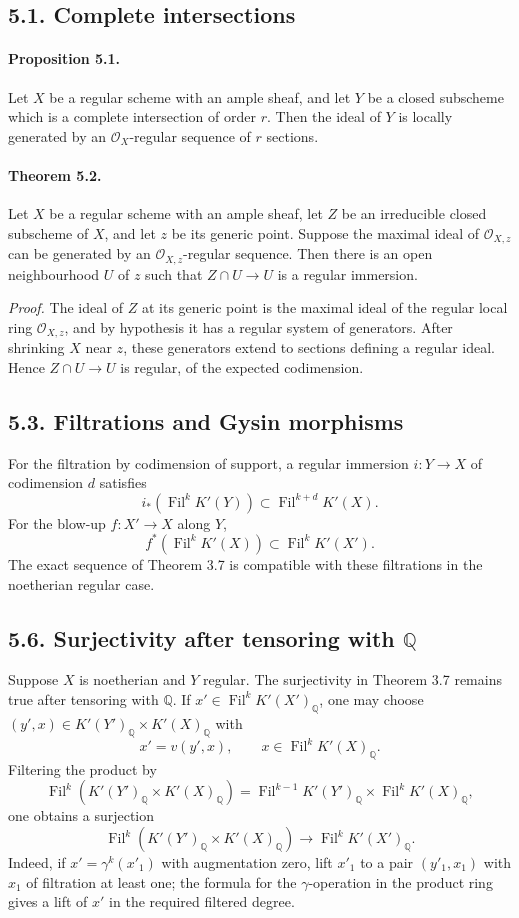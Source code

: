 \documentclass[12pt]{article}
\newcommand{\QQ}{\mathbb Q}
\newcommand{\cO}{\mathcal O}
\newcommand{\Fil}{\operatorname{Fil}}
\begin{document}
\subsection*{5.1. Complete intersections}

\paragraph{Proposition 5.1.} Let $X$ be a regular scheme with an ample sheaf, and let $Y$ be a closed subscheme which is a complete intersection of order $r$. Then the ideal of $Y$ is locally generated by an $\cO_X$-regular sequence of $r$ sections.

\paragraph{Theorem 5.2.} Let $X$ be a regular scheme with an ample sheaf, let $Z$ be an irreducible closed subscheme of $X$, and let $z$ be its generic point. Suppose the maximal ideal of $\cO_{X,z}$ can be generated by an $\cO_{X,z}$-regular sequence. Then there is an open neighbourhood $U$ of $z$ such that $Z\cap U\to U$ is a regular immersion.

\emph{Proof.} The ideal of $Z$ at its generic point is the maximal ideal of the regular local ring $\cO_{X,z}$, and by hypothesis it has a regular system of generators. After shrinking $X$ near $z$, these generators extend to sections defining a regular ideal. Hence $Z\cap U\to U$ is regular, of the expected codimension.

\subsection*{5.3. Filtrations and Gysin morphisms}

For the filtration by codimension of support, a regular immersion $i:Y\to X$ of codimension $d$ satisfies
\[
i_*(\Fil^kK'(Y))\subset\Fil^{k+d}K'(X).
\]
For the blow-up $f:X'\to X$ along $Y$,
\[
f^*(\Fil^kK'(X))\subset\Fil^kK'(X').
\]
The exact sequence of Theorem 3.7 is compatible with these filtrations in the noetherian regular case.

\subsection*{5.6. Surjectivity after tensoring with $\QQ$}

Suppose $X$ is noetherian and $Y$ regular. The surjectivity in Theorem 3.7 remains true after tensoring with $\QQ$. If $x'\in\Fil^kK'(X')_\QQ$, one may choose $(y',x)\in K'(Y')_\QQ\times K'(X)_\QQ$ with
\[
x'=v(y',x),\qquad x\in\Fil^kK'(X)_\QQ.
\]
Filtering the product by
\[
\Fil^k(K'(Y')_\QQ\times K'(X)_\QQ)=\Fil^{k-1}K'(Y')_\QQ\times\Fil^kK'(X)_\QQ,
\]
one obtains a surjection
\[
\Fil^k(K'(Y')_\QQ\times K'(X)_\QQ)\longrightarrow\Fil^kK'(X')_\QQ.
\]
Indeed, if $x'=\gamma^k(x'_1)$ with augmentation zero, lift $x'_1$ to a pair $(y'_1,x_1)$ with $x_1$ of filtration at least one; the formula for the $\gamma$-operation in the product ring gives a lift of $x'$ in the required filtered degree.
\end{document}
